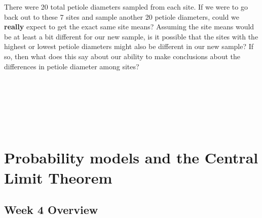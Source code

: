 \documentclass[
]{scrbook}
\begin{document}
There were 20 total petiole diameters sampled from each site.
If we were to go back out to these 7 sites and sample another 20 petiole diameters, could we \textbf{really} expect to get the exact same site means?
Assuming the site means would be at least a bit different for our new sample, is it possible that the sites with the highest or lowest petiole diameters might also be different in our new sample?
If so, then what does this say about our ability to make conclusions about the differences in petiole diameter among sites?

\begin{verbatim}






\end{verbatim}

\hypertarget{part-probability-models-and-the-central-limit-theorem}{%
\part{Probability models and the Central Limit Theorem}\label{part-probability-models-and-the-central-limit-theorem}}

\hypertarget{Week4}{%
\chapter*{Week 4 Overview}\label{Week4}}
\end{document}
